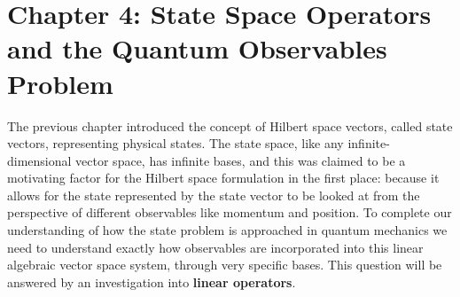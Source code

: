 \chapter{Chapter 4: State Space Operators and the Quantum Observables Problem}
The previous chapter introduced the concept of Hilbert space vectors, called state vectors, representing physical states. The state space, like any infinite-dimensional vector space, has infinite bases, and this was claimed to be a motivating factor for the Hilbert space formulation in the first place: because it allows for the state represented by the state vector to be looked at from the perspective of different observables like momentum and position. To complete our understanding of how the state problem is approached in quantum mechanics we need to understand exactly how observables are incorporated into this linear algebraic vector space system, through very specific bases. This question will be answered by an investigation into \textbf{linear operators}. 
